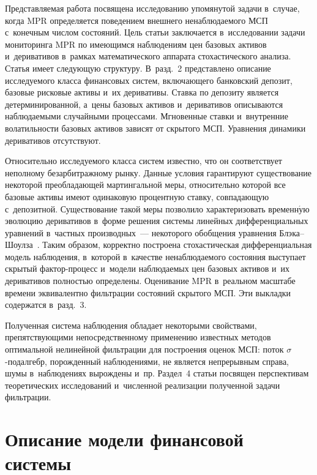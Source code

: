 \begin{multicols}{2}
 Представляемая работа посвящена исследованию упомянутой задачи в~случае, когда MPR определяется поведением внешнего 
 ненаблюдаемого МСП с~конечным числом состояний. Цель статьи заключается в~исследовании задачи 
 мониторинга MPR по имеющимся наблюдениям цен базовых активов и~деривативов в~рамках математического аппарата стохастического анализа. 
 Статья имеет следующую структуру. В~разд.~2 представлено описание исследуемого класса финансовых систем, включающего банковский депозит, 
 базовые рисковые активы и~их деривативы. Ставка по депозиту является детерминированной, а~цены базовых активов и~деривативов описываются 
 наблюдаемыми случайными процессами. Мгновенные ставки и~внутренние волатильности базовых активов зависят от скрытого МСП. 
 Уравнения динамики деривативов отсутствуют.

 Относительно исследуемого класса сис\-тем известно, что он соответствует неполному без\-ар\-бит\-раж\-но\-му рынку.
  Данные условия гарантируют \mbox{существование} некоторой преобладающей мартингальной меры, относительно которой 
  все базовые активы имеют одинаковую процентную ставку, совпадающую с~депозитной. Существование такой меры позволило характеризовать 
  временн$\acute{\mbox{у}}$ю эволюцию деривативов в~форме решения системы линейных дифференциальных уравнений в~частных производных~--- 
  некоторого обобщения уравнения Блэ\-ка--Шоул\-за~\cite{Sh_98}. Таким образом, корректно построена стохастическая дифференциальная модель наблюдения, 
  в~которой в~качестве ненаблюдаемого состояния выступает скрытый фак\-тор-про\-цесс и~модели наблюдаемых цен базовых активов и~их деривативов 
  пол\-ностью определены. Оценивание MPR в~реальном масштабе времени эквивалентно фильтрации состояний скрытого МСП. Эти выкладки содержатся в~разд.~3.

 Полученная система наблюдения обладает некоторыми свойствами, препятствующими непосредственному применению известных методов 
 оптимальной нелинейной фильтрации для построения оценок МСП: поток $\sigma$-под\-ал\-гебр, порожденный наблюдениями, не является непрерывным справа,
  шумы в~наблюдениях вырождены и~пр. Раздел~4 статьи посвящен перспективам теоретических исследований и~численной реализации полученной задачи фильт\-ра\-ции.
  
  \vspace*{-6pt}
  
  \section{Описание модели финансовой системы}
  

\end{multicols}
